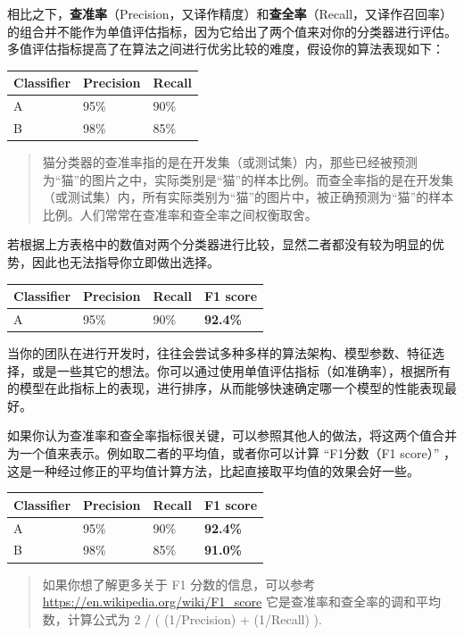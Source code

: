 相比之下，\textbf{查准率}（Precision，又译作精度）和\textbf{查全率}（Recall，又译作召回率）的组合并不能作为单值评估指标，因为它给出了两个值来对你的分类器进行评估。多值评估指标提高了在算法之间进行优劣比较的难度，假设你的算法表现如下：

\begin{longtable}[]{@{}lll@{}}
\toprule
Classifier & Precision & Recall \\
\midrule
\endhead
A & 95\% & 90\% \\
B & 98\% & 85\% \\
\bottomrule
\end{longtable}

\begin{quote}
猫分类器的查准率指的是在开发集（或测试集）内，那些已经被预测为``猫''的图片之中，实际类别是``猫''的样本比例。而查全率指的是在开发集（或测试集）内，所有实际类别为``猫''的图片中，被正确预测为``猫''的样本比例。人们常常在查准率和查全率之间权衡取舍。
\end{quote}

若根据上方表格中的数值对两个分类器进行比较，显然二者都没有较为明显的优势，因此也无法指导你立即做出选择。

\begin{longtable}[]{@{}llll@{}}
\toprule
Classifier & Precision & Recall & F1 score \\
\midrule
\endhead
A & 95\% & 90\% & \textbf{92.4\%} \\
\bottomrule
\end{longtable}

当你的团队在进行开发时，往往会尝试多种多样的算法架构、模型参数、特征选择，或是一些其它的想法。你可以通过使用单值评估指标（如准确率），根据所有的模型在此指标上的表现，进行排序，从而能够快速确定哪一个模型的性能表现最好。

如果你认为查准率和查全率指标很关键，可以参照其他人的做法，将这两个值合并为一个值来表示。例如取二者的平均值，或者你可以计算
``F1分数（F1 score）''
，这是一种经过修正的平均值计算方法，比起直接取平均值的效果会好一些。

\begin{longtable}[]{@{}llll@{}}
\toprule
Classifier & Precision & Recall & F1 score \\
\midrule
\endhead
A & 95\% & 90\% & \textbf{92.4\%} \\
B & 98\% & 85\% & \textbf{91.0\%} \\
\bottomrule
\end{longtable}

\begin{quote}
如果你想了解更多关于 F1 分数的信息，可以参考
\url{https://en.wikipedia.org/wiki/F1_score}
它是查准率和查全率的调和平均数，计算公式为 2 / ( (1/Precision) +
(1/Recall) ).
\end{quote}

